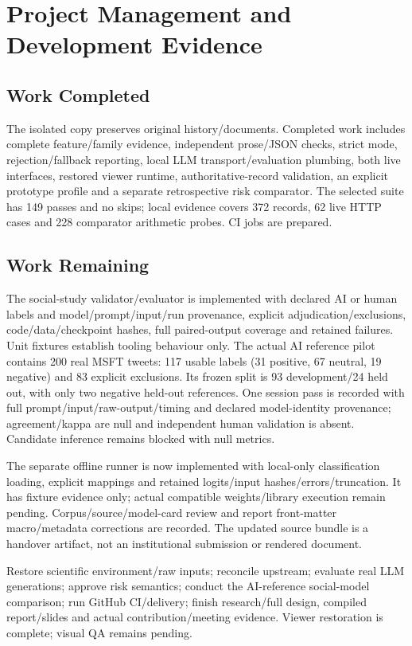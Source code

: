 \chapter{Project Management and Development Evidence}
\section{Work Completed}
The isolated copy preserves original history/documents. Completed work includes complete feature/family evidence, independent prose/JSON checks, strict mode, rejection/fallback reporting, local LLM transport/evaluation plumbing, both live interfaces, restored viewer runtime, authoritative-record validation, an explicit prototype profile and a separate retrospective risk comparator. The selected suite has 149 passes and no skips; local evidence covers 372 records, 62 live HTTP cases and 228 comparator arithmetic probes. CI jobs are prepared.
\section{Work Remaining}
The social-study validator/evaluator is implemented with declared AI or human labels and model/prompt/input/run provenance, explicit adjudication/exclusions, code/data/checkpoint hashes, full paired-output coverage and retained failures. Unit fixtures establish tooling behaviour only. The actual AI reference pilot contains 200 real MSFT tweets: 117 usable labels (31 positive, 67 neutral, 19 negative) and 83 explicit exclusions. Its frozen split is 93 development/24 held out, with only two negative held-out references. One session pass is recorded with full prompt/input/raw-output/timing and declared model-identity provenance; agreement/kappa are null and independent human validation is absent. Candidate inference remains blocked with null metrics.

The separate offline runner is now implemented with local-only classification loading, explicit mappings and retained logits/input hashes/errors/truncation. It has fixture evidence only; actual compatible weights/library execution remain pending. Corpus/source/model-card review and report front-matter macro/metadata corrections are recorded. The updated source bundle is a handover artifact, not an institutional submission or rendered document.

Restore scientific environment/raw inputs; reconcile upstream; evaluate real LLM generations; approve risk semantics; conduct the AI-reference social-model comparison; run GitHub CI/delivery; finish research/full design, compiled report/slides and actual contribution/meeting evidence. Viewer restoration is complete; visual QA remains pending.
